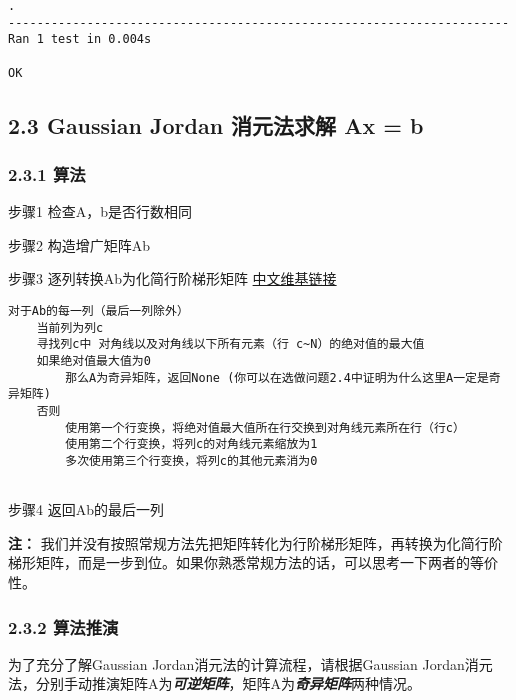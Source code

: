 \documentclass[11pt]{article}
\begin{document}
    \begin{Verbatim}[commandchars=\\\{\}]
.
----------------------------------------------------------------------
Ran 1 test in 0.004s

OK

    \end{Verbatim}

    \subsection{2.3 Gaussian Jordan 消元法求解 Ax =
b}\label{gaussian-jordan-ux6d88ux5143ux6cd5ux6c42ux89e3-ax-b}

    \subsubsection{2.3.1 算法}\label{ux7b97ux6cd5}

步骤1 检查A，b是否行数相同

步骤2 构造增广矩阵Ab

步骤3 逐列转换Ab为化简行阶梯形矩阵
\href{https://zh.wikipedia.org/wiki/\%E9\%98\%B6\%E6\%A2\%AF\%E5\%BD\%A2\%E7\%9F\%A9\%E9\%98\%B5\#.E5.8C.96.E7.AE.80.E5.90.8E.E7.9A.84-.7Bzh-hans:.E8.A1.8C.3B_zh-hant:.E5.88.97.3B.7D-.E9.98.B6.E6.A2.AF.E5.BD.A2.E7.9F.A9.E9.98.B5}{中文维基链接}

\begin{verbatim}
对于Ab的每一列（最后一列除外）
    当前列为列c
    寻找列c中 对角线以及对角线以下所有元素（行 c~N）的绝对值的最大值
    如果绝对值最大值为0
        那么A为奇异矩阵，返回None (你可以在选做问题2.4中证明为什么这里A一定是奇异矩阵)
    否则
        使用第一个行变换，将绝对值最大值所在行交换到对角线元素所在行（行c） 
        使用第二个行变换，将列c的对角线元素缩放为1
        多次使用第三个行变换，将列c的其他元素消为0
        
\end{verbatim}

步骤4 返回Ab的最后一列

\textbf{注：}
我们并没有按照常规方法先把矩阵转化为行阶梯形矩阵，再转换为化简行阶梯形矩阵，而是一步到位。如果你熟悉常规方法的话，可以思考一下两者的等价性。

    \subsubsection{2.3.2 算法推演}\label{ux7b97ux6cd5ux63a8ux6f14}

为了充分了解Gaussian Jordan消元法的计算流程，请根据Gaussian
Jordan消元法，分别手动推演矩阵A为\textbf{\emph{可逆矩阵}}，矩阵A为\textbf{\emph{奇异矩阵}}两种情况。
\end{document}
